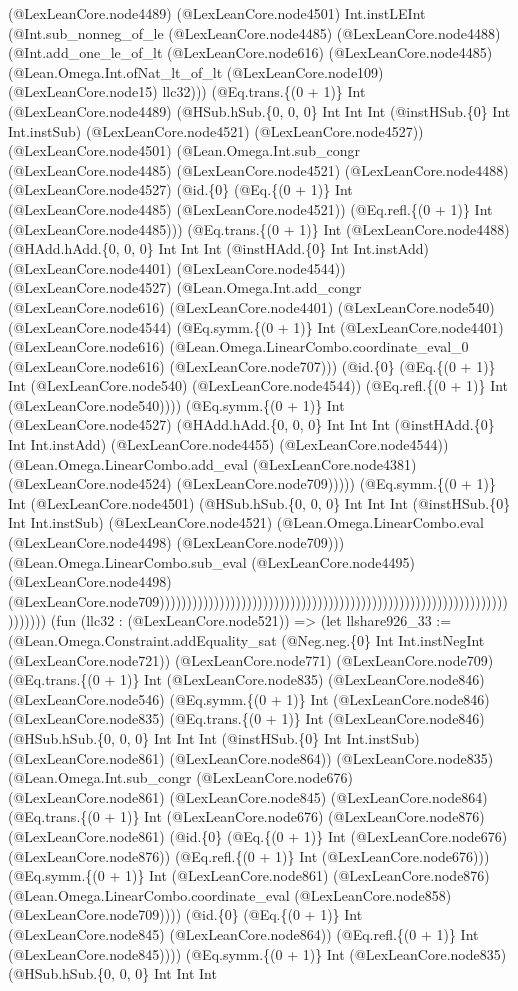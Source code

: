 \documentclass[11pt]{article}
\begin{document}
(@LexLeanCore.node4489) (@LexLeanCore.node4501) Int.instLEInt (@Int.sub\_nonneg\_of\_le (@LexLeanCore.node4485) (@LexLeanCore.node4488) (@Int.add\_one\_le\_of\_lt (@LexLeanCore.node616) (@LexLeanCore.node4485) (@Lean.Omega.Int.ofNat\_lt\_of\_lt (@LexLeanCore.node109) (@LexLeanCore.node15) llc32))) (@Eq.trans.\{(0 + 1)\} Int (@LexLeanCore.node4489) (@HSub.hSub.\{0, 0, 0\} Int Int Int (@instHSub.\{0\} Int Int.instSub) (@LexLeanCore.node4521) (@LexLeanCore.node4527)) (@LexLeanCore.node4501) (@Lean.Omega.Int.sub\_congr (@LexLeanCore.node4485) (@LexLeanCore.node4521) (@LexLeanCore.node4488) (@LexLeanCore.node4527) (@id.\{0\} (@Eq.\{(0 + 1)\} Int (@LexLeanCore.node4485) (@LexLeanCore.node4521)) (@Eq.refl.\{(0 + 1)\} Int (@LexLeanCore.node4485))) (@Eq.trans.\{(0 + 1)\} Int (@LexLeanCore.node4488) (@HAdd.hAdd.\{0, 0, 0\} Int Int Int (@instHAdd.\{0\} Int Int.instAdd) (@LexLeanCore.node4401) (@LexLeanCore.node4544)) (@LexLeanCore.node4527) (@Lean.Omega.Int.add\_congr (@LexLeanCore.node616) (@LexLeanCore.node4401) (@LexLeanCore.node540) (@LexLeanCore.node4544) (@Eq.symm.\{(0 + 1)\} Int (@LexLeanCore.node4401) (@LexLeanCore.node616) (@Lean.Omega.LinearCombo.coordinate\_eval\_0 (@LexLeanCore.node616) (@LexLeanCore.node707))) (@id.\{0\} (@Eq.\{(0 + 1)\} Int (@LexLeanCore.node540) (@LexLeanCore.node4544)) (@Eq.refl.\{(0 + 1)\} Int (@LexLeanCore.node540)))) (@Eq.symm.\{(0 + 1)\} Int (@LexLeanCore.node4527) (@HAdd.hAdd.\{0, 0, 0\} Int Int Int (@instHAdd.\{0\} Int Int.instAdd) (@LexLeanCore.node4455) (@LexLeanCore.node4544)) (@Lean.Omega.LinearCombo.add\_eval (@LexLeanCore.node4381) (@LexLeanCore.node4524) (@LexLeanCore.node709))))) (@Eq.symm.\{(0 + 1)\} Int (@LexLeanCore.node4501) (@HSub.hSub.\{0, 0, 0\} Int Int Int (@instHSub.\{0\} Int Int.instSub) (@LexLeanCore.node4521) (@Lean.Omega.LinearCombo.eval (@LexLeanCore.node4498) (@LexLeanCore.node709))) (@Lean.Omega.LinearCombo.sub\_eval (@LexLeanCore.node4495) (@LexLeanCore.node4498) (@LexLeanCore.node709))))))))))))))))))))))))))))))))))))))))))))))))))))))))))))))))))))))) (fun (llc32 : (@LexLeanCore.node521)) => (let llshare926\_33 := (@Lean.Omega.Constraint.addEquality\_sat (@Neg.neg.\{0\} Int Int.instNegInt (@LexLeanCore.node721)) (@LexLeanCore.node771) (@LexLeanCore.node709) (@Eq.trans.\{(0 + 1)\} Int (@LexLeanCore.node835) (@LexLeanCore.node846) (@LexLeanCore.node546) (@Eq.symm.\{(0 + 1)\} Int (@LexLeanCore.node846) (@LexLeanCore.node835) (@Eq.trans.\{(0 + 1)\} Int (@LexLeanCore.node846) (@HSub.hSub.\{0, 0, 0\} Int Int Int (@instHSub.\{0\} Int Int.instSub) (@LexLeanCore.node861) (@LexLeanCore.node864)) (@LexLeanCore.node835) (@Lean.Omega.Int.sub\_congr (@LexLeanCore.node676) (@LexLeanCore.node861) (@LexLeanCore.node845) (@LexLeanCore.node864) (@Eq.trans.\{(0 + 1)\} Int (@LexLeanCore.node676) (@LexLeanCore.node876) (@LexLeanCore.node861) (@id.\{0\} (@Eq.\{(0 + 1)\} Int (@LexLeanCore.node676) (@LexLeanCore.node876)) (@Eq.refl.\{(0 + 1)\} Int (@LexLeanCore.node676))) (@Eq.symm.\{(0 + 1)\} Int (@LexLeanCore.node861) (@LexLeanCore.node876) (@Lean.Omega.LinearCombo.coordinate\_eval (@LexLeanCore.node858) (@LexLeanCore.node709)))) (@id.\{0\} (@Eq.\{(0 + 1)\} Int (@LexLeanCore.node845) (@LexLeanCore.node864)) (@Eq.refl.\{(0 + 1)\} Int (@LexLeanCore.node845)))) (@Eq.symm.\{(0 + 1)\} Int (@LexLeanCore.node835) (@HSub.hSub.\{0, 0, 0\} Int Int Int 
\end{document}
